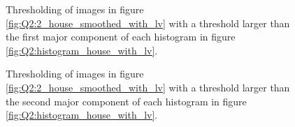 \begin{figure}[H]
	\centering
	\scalebox{0.9}{}
	\caption{Thresholding of images in figure \ref{fig:Q2:2_house_smoothed_with_lv} with a threshold larger than the first major component of 
	each histogram in figure \ref{fig:Q2:histogram_house_with_lv}.}
	\label{fig:Q2:threshold_house_1_with_lv}
\end{figure}

\begin{figure}[H]
	\centering
	\scalebox{0.9}{}
	\caption{Thresholding of images in figure \ref{fig:Q2:2_house_smoothed_with_lv} with a threshold larger than the second major component of 
	each histogram in figure \ref{fig:Q2:histogram_house_with_lv}.}
	\label{fig:Q2:threshold_house_2_with_lv}
\end{figure}

